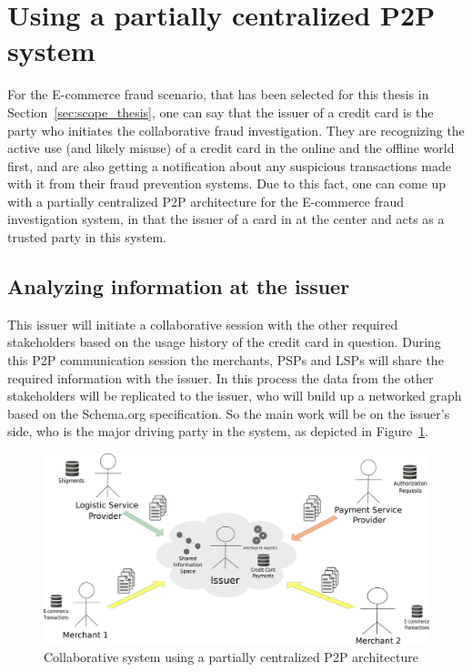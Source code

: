 
\section{Using a partially centralized \gls{P2P} system}
\label{sec:p2p_partially_centralized_system}

For the \gls{E-commerce} fraud scenario, that has been selected for this thesis in Section~\ref{sec:scope_thesis}, one can say that the issuer of a credit card is the party who initiates the collaborative fraud investigation. They are recognizing the active use (and likely misuse) of a credit card in the online and the offline world first, and are also getting a notification about any suspicious transactions made with it from their fraud prevention systems. Due to this fact, one can come up with a partially centralized \gls{P2P} architecture for the \gls{E-commerce} fraud investigation system, in that the issuer of a card in at the center and acts as a trusted party in this system.

\subsection{Analyzing information at the issuer}
\label{subsec:p2p_partially_issuer_collecting}

This issuer will initiate a collaborative session with the other required stakeholders based on the usage history of the credit card in question. During this \gls{P2P} communication session the merchants, \gls{PSP}s and \gls{LSP}s will share the required information with the issuer. In this process the data from the other stakeholders will be replicated to the issuer, who will build up a networked graph based on the Schema.org specification. So the main work will be on the issuer's side, who is the major driving party in the system, as depicted in Figure~\ref{fig:images_p2p_centralized}.\@

\begin{figure}[H]
	\centering
		\includegraphics[width=0.9\columnwidth]{images/system_P2P_centralized.pdf}
	\caption{Collaborative system using a partially centralized \gls{P2P} architecture}
\label{fig:images_p2p_centralized}
\end{figure}

